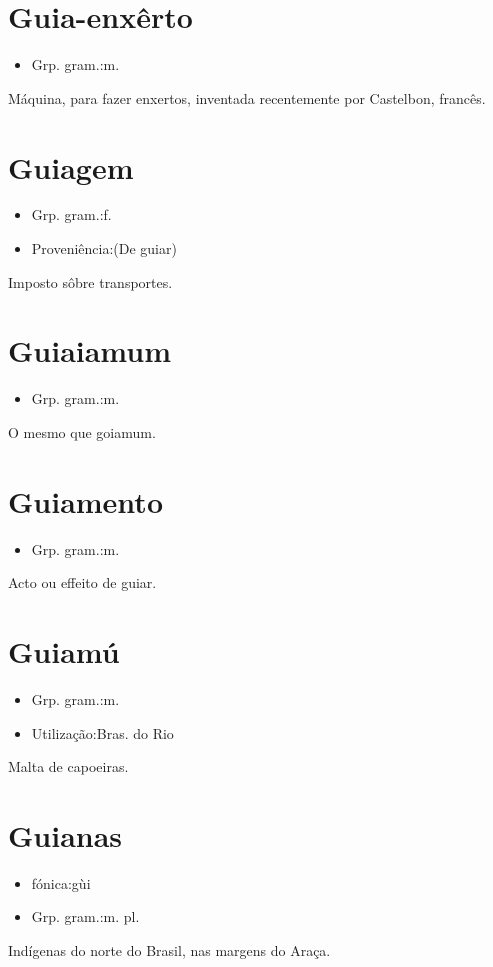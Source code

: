 \section{Guia-enxêrto}
\begin{itemize}
\item {Grp. gram.:m.}
\end{itemize}
Máquina, para fazer enxertos, inventada recentemente por Castelbon, francês.
\section{Guiagem}
\begin{itemize}
\item {Grp. gram.:f.}
\end{itemize}
\begin{itemize}
\item {Proveniência:(De \textunderscore guiar\textunderscore )}
\end{itemize}
Imposto sôbre transportes.
\section{Guiaiamum}
\begin{itemize}
\item {Grp. gram.:m.}
\end{itemize}
O mesmo que \textunderscore goiamum\textunderscore .
\section{Guiamento}
\begin{itemize}
\item {Grp. gram.:m.}
\end{itemize}
Acto ou effeito de guiar.
\section{Guiamú}
\begin{itemize}
\item {Grp. gram.:m.}
\end{itemize}
\begin{itemize}
\item {Utilização:Bras. do Rio}
\end{itemize}
Malta de capoeiras.
\section{Guianas}
\begin{itemize}
\item {fónica:gùi}
\end{itemize}
\begin{itemize}
\item {Grp. gram.:m. pl.}
\end{itemize}
Indígenas do norte do Brasil, nas margens do Araça.
